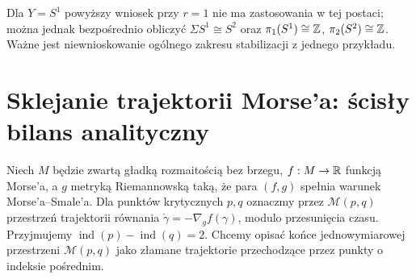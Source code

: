 \begin{przyklad}
Dla $Y=S^1$ powyższy wniosek przy $r=1$ nie ma zastosowania
w tej postaci; można jednak bezpośrednio obliczyć
$\Sigma S^1\cong S^2$ oraz
$\pi_1(S^1)\cong\mathbb{Z}$, $\pi_2(S^2)\cong\mathbb{Z}$.
Ważne jest niewnioskowanie ogólnego zakresu stabilizacji
z jednego przykładu.
\end{przyklad}

\section{Sklejanie trajektorii Morse'a: ścisły bilans analityczny}
Niech $M$ będzie zwartą gładką rozmaitością bez brzegu,
$f:M\to\mathbb{R}$ funkcją Morse'a, a $g$ metryką Riemannowską
taką, że para $(f,g)$ spełnia warunek Morse'a--Smale'a.
Dla punktów krytycznych $p,q$ oznaczmy przez
$\mathcal M(p,q)$ przestrzeń trajektorii równania
$\dot\gamma=-\nabla_g f(\gamma)$, modulo przesunięcia czasu.
Przyjmujemy $\operatorname{ind}(p)-\operatorname{ind}(q)=2$.
Chcemy opisać końce jednowymiarowej przestrzeni
$\mathcal M(p,q)$ jako złamane trajektorie przechodzące
przez punkty o indeksie pośrednim.


